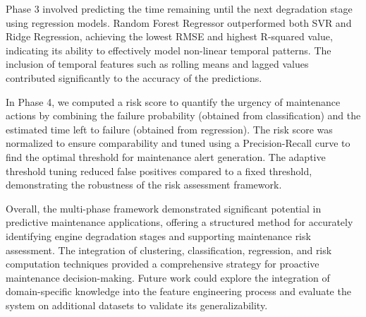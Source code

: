 \documentclass[conference]{IEEEtran}
\begin{document}
Phase 3 involved predicting the time remaining until the next degradation stage using regression models. Random Forest Regressor outperformed both SVR and Ridge Regression, achieving the lowest RMSE and highest R-squared value, indicating its ability to effectively model non-linear temporal patterns. The inclusion of temporal features such as rolling means and lagged values contributed significantly to the accuracy of the predictions.

In Phase 4, we computed a risk score to quantify the urgency of maintenance actions by combining the failure probability (obtained from classification) and the estimated time left to failure (obtained from regression). The risk score was normalized to ensure comparability and tuned using a Precision-Recall curve to find the optimal threshold for maintenance alert generation. The adaptive threshold tuning reduced false positives compared to a fixed threshold, demonstrating the robustness of the risk assessment framework.

Overall, the multi-phase framework demonstrated significant potential in predictive maintenance applications, offering a structured method for accurately identifying engine degradation stages and supporting maintenance risk assessment. The integration of clustering, classification, regression, and risk computation techniques provided a comprehensive strategy for proactive maintenance decision-making. Future work could explore the integration of domain-specific knowledge into the feature engineering process and evaluate the system on additional datasets to validate its generalizability.
\end{document}
